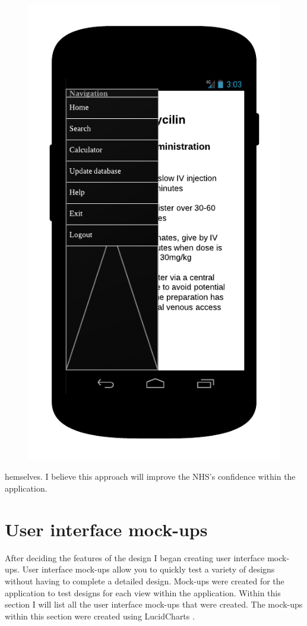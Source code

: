 \begin{description}
\begin{figure}
\begin{minipage}{.5\textwidth}
  \includegraphics[width=.7\linewidth]{Images/mockups/menu.png}
\end{minipage}
\end{figure}hemselves. I believe this approach will improve the NHS's confidence within the application.

\section{User interface mock-ups}
After deciding the features of the design I began creating user interface mock-ups. User interface mock-ups allow you to quickly test a variety of designs without having to complete a detailed design. Mock-ups were created for the application to test designs for each view within the application. Within this section I will list all the user interface mock-ups that were created. The mock-ups within this section were created using LucidCharts \cite{lucid_charts}.


\end{description}

